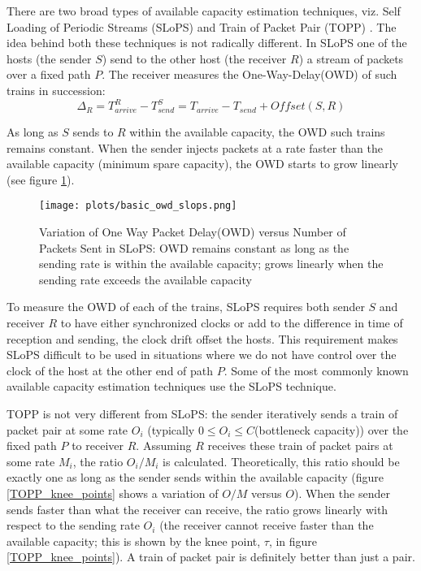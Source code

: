 There are two broad types of available capacity estimation techniques,
viz. Self Loading of Periodic Streams (SLoPS) and Train of Packet Pair
(TOPP) \cite{ieee2003}. The idea behind both these techniques is not
radically different. In SLoPS one of the hosts (the sender $S$) send
to the other host (the receiver $R$) a stream of packets over a fixed
path $P$. The receiver measures the One-Way-Delay(OWD) of such trains
in succession\cite{pathload_jain_ppt}:
\vspace{-0.05in}
$$\Delta_R = T^R_{arrive} - T^S_{send} = T_{arrive} - T_{send} + Offset(S,R)$$ 

As long as $S$ sends to $R$ within the available capacity, the OWD
such trains remains constant. When the sender injects packets at a
rate faster than the available capacity (minimum spare capacity), the
OWD starts to grow linearly (see figure \ref{basic_owd_slops}).

\begin{figure}[htp]
  \centering		
  \texttt{[image: plots/basic\_owd\_slops.png]} 
  \vspace{-.1in}
  \centering
  \caption{Variation of One Way Packet Delay(OWD) versus Number of
	Packets Sent in SLoPS: OWD remains constant as long as the sending
	rate is within the available capacity; grows linearly when the
	sending rate exceeds the available capacity}
  \label{basic_owd_slops}
\end{figure}
 
To measure the OWD of each of the trains, SLoPS requires both sender
$S$ and receiver $R$ to have either synchronized clocks or add to the
difference in time of reception and sending, the clock drift offset
the hosts. This requirement makes SLoPS difficult to be used in
situations where we do not have control over the clock of the host at
the other end of path $P$.  Some of the most commonly known available
capacity estimation techniques use the SLoPS technique.

TOPP \cite{TOPP_globecom2000} is not very different from SLoPS: the
sender iteratively sends a train of packet pair at some rate $O_i$
(typically $0 \le O_i \le C $(bottleneck capacity)) over the fixed
path $P$ to receiver $R$. Assuming $R$ receives these train of packet
pairs at some rate $M_i$, the ratio $O_i/M_i$ is
calculated. Theoretically, this ratio should be exactly one as long as
the sender sends within the available capacity (figure
\ref{TOPP_knee_points} shows a variation of $O/M$ versus $O$). When
the sender sends faster than what the receiver can receive, the ratio
grows linearly with respect to the sending rate $O_i$ (the receiver
cannot receive faster than the available capacity; this is shown by
the knee point, $\tau$, in figure \ref{TOPP_knee_points}). A train of
packet pair is definitely better than just a pair.

